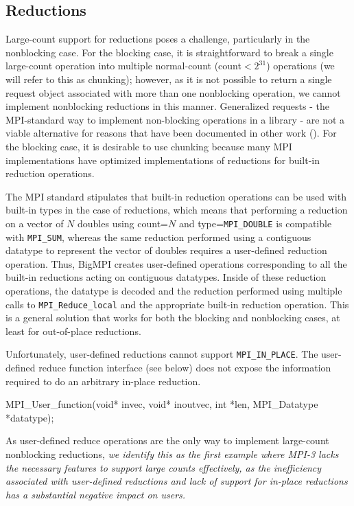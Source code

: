 
\subsection{Reductions}
\label{sec:reductions}

Large-count support for reductions poses a challenge, particularly in the nonblocking case.
For the blocking case, it is straightforward to break a single large-count operation into
multiple normal-count (count$<2^{31}$) operations (we will refer to this as chunking); 
however, as it is not possible to return a single request object associated with more than 
one nonblocking operation, we cannot implement nonblocking reductions in this manner.
Generalized requests - the MPI-standard way to implement non-blocking operations 
in a library - are not a viable alternative for reasons that have been documented 
in other work (\cite{latham:grequest-extensions}).
For the blocking case, it is desirable to use chunking because many MPI implementations 
have optimized implementations of reductions for built-in reduction operations.

The MPI standard stipulates that built-in reduction operations can be used with built-in types
in the case of reductions, which means that performing a reduction on a vector of $N$
doubles using count=$N$ and type=\texttt{MPI\_DOUBLE} is compatible with \texttt{MPI\_SUM},
whereas the same reduction performed using a contiguous datatype to represent the vector
of doubles requires a user-defined reduction operation.
Thus, BigMPI creates user-defined operations corresponding to all the built-in reductions
acting on contiguous datatypes.  Inside of these reduction operations, the datatype is
decoded and the reduction performed using multiple calls to \texttt{MPI\_Reduce\_local}
and the appropriate built-in reduction operation.
This is a general solution that works for both the blocking and nonblocking cases,
at least for out-of-place reductions.

Unfortunately, user-defined reductions cannot support \texttt{MPI\_IN\_PLACE}.
The user-defined reduce function interface (see below) does not expose
the information required to do an arbitrary in-place reduction.
\begin{code}
MPI_User_function(void* invec, void* inoutvec, 
                  int *len, MPI_Datatype *datatype);
\end{code}
As user-defined reduce operations are the only way to implement
large-count nonblocking reductions, \textit{we identify this as the first example
where MPI-3 lacks the necessary features to support large counts effectively,
as the inefficiency associated with user-defined reductions and lack of support
for in-place reductions has a substantial negative impact on users.}
